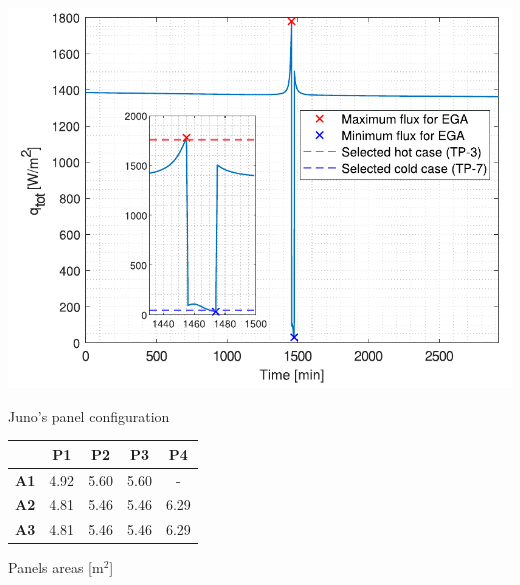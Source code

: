 \begin{itemize}














\end{itemize}

\begin{minipage}{0.5\linewidth}
    \centering
    \captionsetup{type=figure}
    \includegraphics[width=\linewidth]{Images/EGA_flux_analysis.pdf}
    \caption{Juno's panel configuration}
    \label{fig:panel_config}
\end{minipage}\hfill
\begin{minipage}{0.5\linewidth}
    \centering
    \captionsetup{type=table}
    \renewcommand{\arraystretch}{1.4}
    \begin{tabular}{|c|c|c|c|c|}
        \hline
        &  \textbf{P1}  & \textbf{P2} & \textbf{P3} & \textbf{P4}\\
        \hline
        \hline
        \textbf{A1}      & 4.92 & 5.60 & 5.60 & - \\
        \hline
        \textbf{A2}      & 4.81 & 5.46 & 5.46 & 6.29  \\
        \hline
        \textbf{A3}     & 4.81 & 5.46 & 5.46 & 6.29  \\
        \hline
    \end{tabular}
    \caption{Panels areas [m$^2$]}
    \label{table:panels_area}
\end{minipage}



